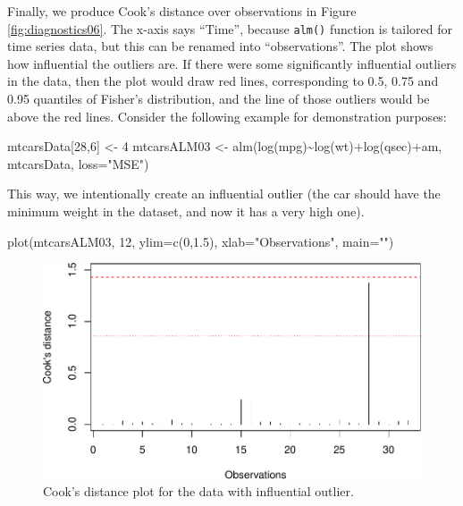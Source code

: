 \documentclass[
]{book}
\newenvironment{Shaded}{\begin{snugshade}}{\end{snugshade}}
\newcommand{\AttributeTok}[1]{\textcolor[rgb]{0.77,0.63,0.00}{#1}}
\newcommand{\DecValTok}[1]{\textcolor[rgb]{0.00,0.00,0.81}{#1}}
\newcommand{\FloatTok}[1]{\textcolor[rgb]{0.00,0.00,0.81}{#1}}
\newcommand{\FunctionTok}[1]{\textcolor[rgb]{0.00,0.00,0.00}{#1}}
\newcommand{\NormalTok}[1]{#1}
\newcommand{\OtherTok}[1]{\textcolor[rgb]{0.56,0.35,0.01}{#1}}
\newcommand{\SpecialCharTok}[1]{\textcolor[rgb]{0.00,0.00,0.00}{#1}}
\newcommand{\StringTok}[1]{\textcolor[rgb]{0.31,0.60,0.02}{#1}}
\theoremstyle{definition}
\theoremstyle{definition}
\theoremstyle{definition}
\theoremstyle{definition}
\theoremstyle{remark}
\begin{document}
Finally, we produce Cook's distance over observations in Figure \ref{fig:diagnostics06}. The x-axis says ``Time'', because \texttt{alm()} function is tailored for time series data, but this can be renamed into ``observations''. The plot shows how influential the outliers are. If there were some significantly influential outliers in the data, then the plot would draw red lines, corresponding to 0.5, 0.75 and 0.95 quantiles of Fisher's distribution, and the line of those outliers would be above the red lines. Consider the following example for demonstration purposes:

\begin{Shaded}
\begin{Highlighting}[]
\NormalTok{mtcarsData[}\DecValTok{28}\NormalTok{,}\DecValTok{6}\NormalTok{] }\OtherTok{\textless{}{-}} \DecValTok{4}
\NormalTok{mtcarsALM03 }\OtherTok{\textless{}{-}} \FunctionTok{alm}\NormalTok{(}\FunctionTok{log}\NormalTok{(mpg)}\SpecialCharTok{\textasciitilde{}}\FunctionTok{log}\NormalTok{(wt)}\SpecialCharTok{+}\FunctionTok{log}\NormalTok{(qsec)}\SpecialCharTok{+}\NormalTok{am, mtcarsData, }\AttributeTok{loss=}\StringTok{"MSE"}\NormalTok{)}
\end{Highlighting}
\end{Shaded}

This way, we intentionally create an influential outlier (the car should have the minimum weight in the dataset, and now it has a very high one).

\begin{Shaded}
\begin{Highlighting}[]
\FunctionTok{plot}\NormalTok{(mtcarsALM03, }\DecValTok{12}\NormalTok{, }\AttributeTok{ylim=}\FunctionTok{c}\NormalTok{(}\DecValTok{0}\NormalTok{,}\FloatTok{1.5}\NormalTok{), }\AttributeTok{xlab=}\StringTok{"Observations"}\NormalTok{, }\AttributeTok{main=}\StringTok{""}\NormalTok{)}
\end{Highlighting}
\end{Shaded}

\begin{figure}
\centering
\includegraphics{Svetunkov---Statistics-for-Business-Analytics_files/figure-latex/diagnostics07-1.pdf}
\caption{\label{fig:diagnostics07}Cook's distance plot for the data with influential outlier.}
\end{figure}
\end{document}
